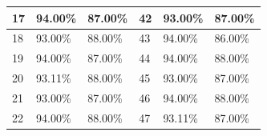 \begin{table}[H]
\begin{tabular}{|l|l|l|l|l|l|}
		17 & 94.00\%                                                                                       & 87.00\%                                                                                         & 42 & 93.00\%                                                                                       & 87.00\%                                                                                         \\ \hline
		18 & 93.00\%                                                                                       & 88.00\%                                                                                         & 43 & 94.00\%                                                                                       & 86.00\%                                                                                         \\ \hline
		19 & 94.00\%                                                                                       & 87.00\%                                                                                         & 44 & 94.00\%                                                                                       & 88.00\%                                                                                         \\ \hline
		20 & 93.11\%                                                                                       & 88.00\%                                                                                         & 45 & 93.00\%                                                                                       & 87.00\%                                                                                         \\ \hline
		21 & 93.00\%                                                                                       & 87.00\%                                                                                         & 46 & 94.00\%                                                                                       & 88.00\%                                                                                         \\ \hline
		22 & 94.00\%                                                                                       & 88.00\%                                                                                         & 47 & 93.11\%                                                                                       & 87.00\%                                                                                         \\ \hline

\end{tabular}
\end{table}
